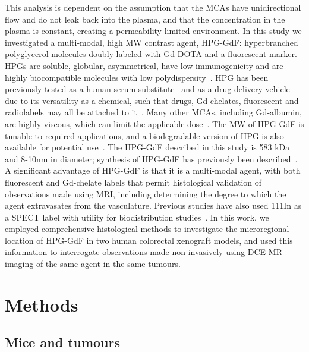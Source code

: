 This analysis is dependent on the assumption that the \acs{MCA}s have unidirectional flow and do not leak back into the plasma, and that the concentration in the plasma is constant, creating a permeability-limited environment.
In this study we investigated a multi-modal, high \acs{MW} contrast agent, \acs{HPG-GdF}: hyperbranched polyglycerol molecules doubly labeled with Gd-DOTA and a fluorescent marker.
HPGs are soluble, globular, asymmetrical, have low immunogenicity and are highly biocompatible molecules with low polydispersity~\cite{Saatchi:2012hc,Kainthan:2006ce,Saatchi:2012gc}.
HPG has been previously tested as a human serum substitute~\cite{Kainthan:2008ek} and as a drug delivery vehicle due to its versatility as a chemical, such that drugs, Gd chelates, fluorescent and radiolabels may all be attached to it~\cite{Shenoi:2013id}.
Many other \acs{MCA}s, including Gd-albumin, are highly viscous, which can limit the applicable dose~\cite{Imranulhaq:2012ij}.
The \acs{MW} of \acs{HPG-GdF} is tunable to required applications, and a biodegradable version of HPG is also available for potential use~\cite{Shenoi:2013id}.
The \acs{HPG-GdF} described in this study is 583 \acs{kDa} and 8-10nm in diameter; synthesis of \acs{HPG-GdF} has previously been described~\cite{Saatchi:2012hc}.
A significant advantage of \acs{HPG-GdF} is that it is a multi-modal agent, with both fluorescent and Gd-chelate labels that permit histological validation of observations made using MRI, including determining the degree to which the agent extravasates from the vasculature.
Previous studies have also used 111In as a SPECT label with utility for biodistribution studies~\cite{Saatchi:2012hc}.
In this work, we employed comprehensive histological methods to investigate the microregional location of \acs{HPG-GdF} in two human colorectal xenograft models, and used this information to interrogate observations made non-invasively using DCE-MR imaging of the same agent in the same tumours.

\section{Methods}

\subsection{Mice and tumours}

